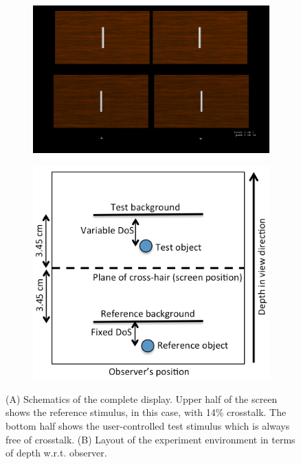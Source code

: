 \begin{figure}[htbp]
    \centering
    \begin{subfigure}[b]{0.8\textwidth}
        \includegraphics[width=\textwidth]{./Template_Figures/exp_env}
        \caption{}\label{fig:exp_env}
    \end{subfigure}

    \begin{subfigure}[b]{0.4\textwidth}
        \includegraphics[width=\textwidth]{./Template_Figures/exp_env_depth}
        \caption{}\label{fig:exp_env_depth}
    \end{subfigure}

    \caption{(A) Schematics of the complete display. Upper half of the screen shows the reference stimulus, in this case, with 14\% crosstalk. The bottom half shows the user-controlled test stimulus which is always free of crosstalk. (B) Layout of the experiment environment in terms of depth w.r.t. observer.\label{fig:exp_env_overall}}
\end{figure}

